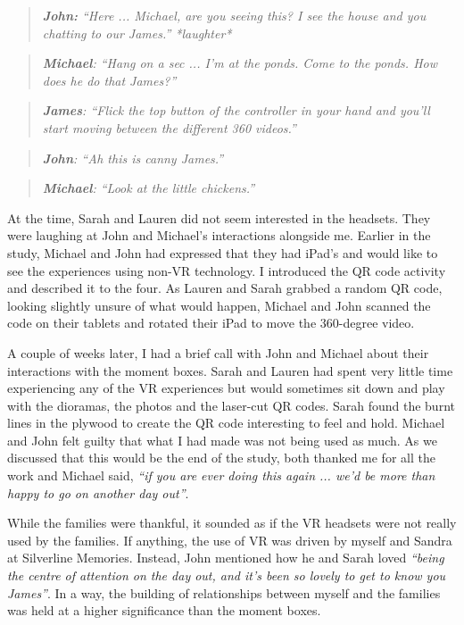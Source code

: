 \begin{quote}
\textit{    \textbf{John:} ``Here ... Michael, are you seeing this? I see the house and you chatting to our James.'' *laughter*
}
\end{quote}
\begin{quote}
\textit{    \textbf{Michael}: ``Hang on a sec ... I'm at the ponds. Come to the ponds. How does he do that James?''
}
\end{quote}
\begin{quote}
\textit{    \textbf{James}: ``Flick the top button of the controller in your hand and you'll start moving between the different 360 videos.''
}
\end{quote}
\begin{quote}
\textit{   \textbf{ John}: ``Ah this is canny James.''
}
\end{quote}
\begin{quote}
\textit{    \textbf{Michael}: ``Look at the little chickens.''}
\end{quote}
At the time, Sarah and Lauren did not seem interested in the headsets. They were laughing at John and Michael's interactions alongside me. Earlier in the study, Michael and John had expressed that they had iPad's and would like to see the experiences using non-VR technology. I introduced the QR code activity and described it to the four. As Lauren and Sarah grabbed a random QR code, looking slightly unsure of what would happen, Michael and John scanned the code on their tablets and rotated their iPad to move the 360-degree video.

A couple of weeks later, I had a brief call with John and Michael about their interactions with the moment boxes. Sarah and Lauren had spent very little time experiencing any of the VR experiences but would sometimes sit down and play with the dioramas, the photos and the laser-cut QR codes. Sarah found the burnt lines in the plywood to create the QR code interesting to feel and hold. Michael and John felt guilty that what I had made was not being used as much. As we discussed that this would be the end of the study, both thanked me for all the work and Michael said, \textit{``if you are ever doing this again ... we'd be more than happy to go on another day out''}.

While the families were thankful, it sounded as if the VR headsets were not really used by the families. If anything, the use of VR was driven by myself and Sandra at Silverline Memories. Instead, John mentioned how he and Sarah loved \textit{``being the centre of attention on the day out, and it's been so lovely to get to know you James''}. In a way, the building of relationships between myself and the families was held at a higher significance than the moment boxes.

